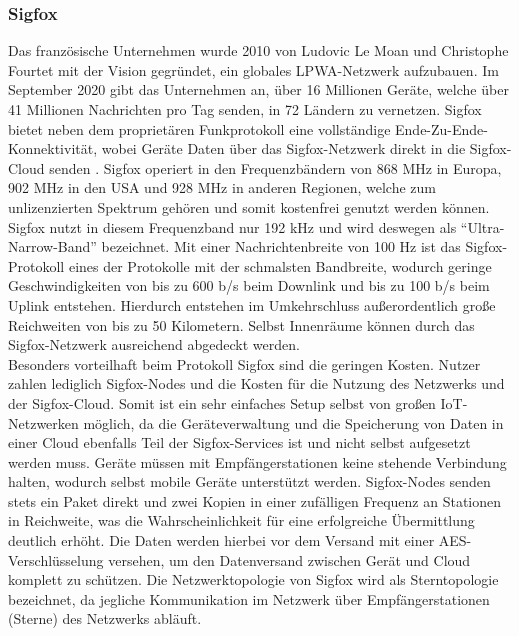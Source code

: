 \subsubsection{Sigfox}
\label{sec:ThHi:sigfox}

Das französische Unternehmen  wurde 2010 von Ludovic Le Moan und Christophe Fourtet mit der Vision gegründet, ein globales LPWA-Netzwerk aufzubauen. Im September 2020 gibt das Unternehmen an, über 16 Millionen Geräte, welche über 41 Millionen Nachrichten pro Tag senden, in 72 Ländern zu vernetzen. Sigfox bietet neben dem proprietären Funkprotokoll eine vollständige Ende-Zu-Ende-Konnektivität, wobei Geräte Daten über das Sigfox-Netzwerk direkt in die Sigfox-Cloud senden . Sigfox operiert in den Frequenzbändern von 868 MHz in Europa, 902 MHz in den USA und 928 MHz in anderen Regionen, welche zum unlizenzierten Spektrum gehören und somit kostenfrei genutzt werden können. Sigfox nutzt in diesem Frequenzband nur 192 kHz und wird deswegen als ``Ultra-Narrow-Band'' bezeichnet. Mit einer Nachrichtenbreite von 100 Hz ist das Sigfox-Protokoll eines der Protokolle mit der schmalsten Bandbreite, wodurch geringe Geschwindigkeiten von bis zu 600 b/s beim Downlink und bis zu 100 b/s beim Uplink entstehen. Hierdurch entstehen im Umkehrschluss außerordentlich große Reichweiten von bis zu 50 Kilometern. Selbst Innenräume können durch das Sigfox-Netzwerk ausreichend abgedeckt werden.\\
Besonders vorteilhaft beim Protokoll Sigfox sind die geringen Kosten. Nutzer zahlen lediglich Sigfox-Nodes und die Kosten für die Nutzung des Netzwerks und der Sigfox-Cloud. Somit ist ein sehr einfaches Setup selbst von großen IoT-Netzwerken möglich, da die Geräteverwaltung und die Speicherung von Daten in einer Cloud ebenfalls Teil der Sigfox-Services ist und nicht selbst aufgesetzt werden muss. Geräte müssen mit Empfängerstationen keine stehende Verbindung halten, wodurch selbst mobile Geräte unterstützt werden. Sigfox-Nodes senden stets ein Paket direkt und zwei Kopien in einer zufälligen Frequenz an Stationen in Reichweite, was die Wahrscheinlichkeit für eine erfolgreiche Übermittlung deutlich erhöht. Die Daten werden hierbei vor dem Versand mit einer AES-Verschlüsselung versehen, um den Datenversand zwischen Gerät und Cloud komplett zu schützen. Die Netzwerktopologie von Sigfox wird als Sterntopologie bezeichnet, da jegliche Kommunikation im Netzwerk über Empfängerstationen (Sterne) des Netzwerks abläuft.\\
